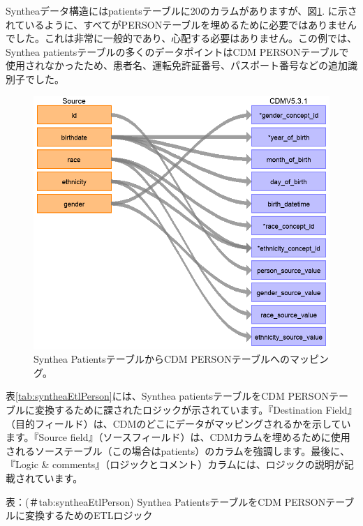 \documentclass[
  11pt]{book}
\theoremstyle{definition}
\theoremstyle{definition}
\theoremstyle{definition}
\theoremstyle{definition}
\theoremstyle{remark}
\begin{document}
Syntheaデータ構造にはpatientsテーブルに20のカラムがありますが、図\ref{fig:syntheaPerson}. に示されているように、すべてがPERSONテーブルを埋めるために必要ではありませんでした。これは非常に一般的であり、心配する必要はありません。この例では、Synthea patientsテーブルの多くのデータポイントはCDM PERSONテーブルで使用されなかったため、患者名、運転免許証番号、パスポート番号などの追加識別子でした。

\begin{figure}

{\centering \includegraphics[width=1\linewidth]{images/ExtractTransformLoad/syntheaPersonTable} 

}

\caption{Synthea PatientsテーブルからCDM PERSONテーブルへのマッピング。}\label{fig:syntheaPerson}
\end{figure}

表\ref{tab:syntheaEtlPerson}には、Synthea patientsテーブルをCDM PERSONテーブルに変換するために課されたロジックが示されています。『Destination Field』（目的フィールド）は、CDMのどこにデータがマッピングされるかを示しています。『Source field』（ソースフィールド）は、CDMカラムを埋めるために使用されるソーステーブル（この場合はpatients）のカラムを強調します。最後に、『Logic \& comments』（ロジックとコメント）カラムには、ロジックの説明が記載されています。

表：(＃tab:syntheaEtlPerson) Synthea PatientsテーブルをCDM PERSONテーブルに変換するためのETLロジック
\end{document}
